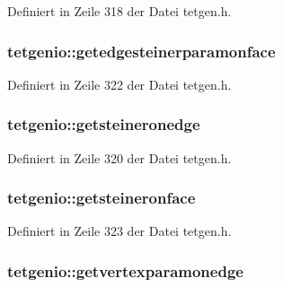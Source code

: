 Definiert in Zeile 318 der Datei tetgen.\-h.

\hypertarget{classtetgenio_adc6e23ad6a58080844e7096a60d667cf}{
\subsubsection[{getedgesteinerparamonface}]{ tetgenio\-::getedgesteinerparamonface}}\label{classtetgenio_adc6e23ad6a58080844e7096a60d667cf}


Definiert in Zeile 322 der Datei tetgen.\-h.

\hypertarget{classtetgenio_a08ab06b4e0af5a4911a0d5ae04fe08e3}{
\subsubsection[{getsteineronedge}]{ tetgenio\-::getsteineronedge}}\label{classtetgenio_a08ab06b4e0af5a4911a0d5ae04fe08e3}


Definiert in Zeile 320 der Datei tetgen.\-h.

\hypertarget{classtetgenio_a611b575fcfc845416f2d151afcf5c6aa}{
\subsubsection[{getsteineronface}]{ tetgenio\-::getsteineronface}}\label{classtetgenio_a611b575fcfc845416f2d151afcf5c6aa}


Definiert in Zeile 323 der Datei tetgen.\-h.

\hypertarget{classtetgenio_a7278480edf09861f713ad92e589221f2}{
\subsubsection[{getvertexparamonedge}]{ tetgenio\-::getvertexparamonedge}}\label{classtetgenio_a7278480edf09861f713ad92e589221f2}



